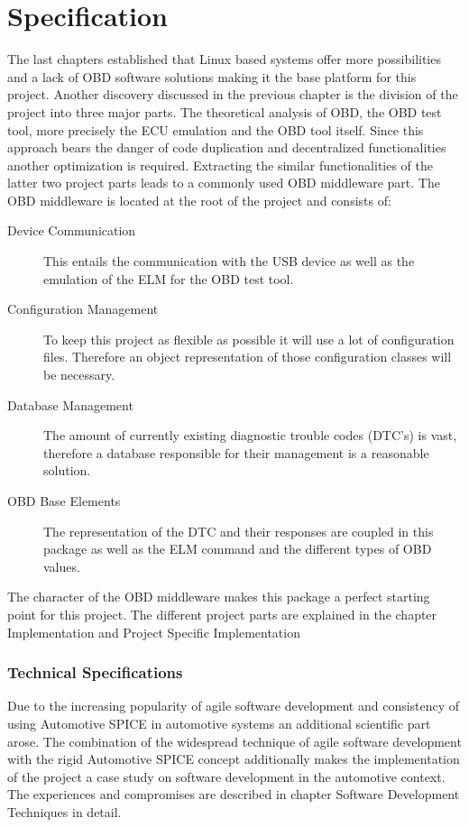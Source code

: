 
\chapter{Specification}
The last chapters established that Linux based systems offer more possibilities and a lack of OBD software solutions making it the base platform for 
this project. Another discovery discussed in the previous chapter is the division of the project into three major parts. The theoretical analysis of 
OBD, the OBD test tool, more precisely the ECU emulation and the OBD tool itself. Since this approach bears the danger of code duplication and 
decentralized functionalities another optimization is required.  Extracting the similar functionalities of the latter two project parts leads to a 
commonly used OBD middleware part. 
The OBD middleware is located at the root of the project and consists of:
\begin{description}
\item[Device Communication]

This entails the communication with the USB device as well as the emulation of the ELM for the OBD test tool.
\item[Configuration Management]

To keep this project as flexible as possible it will use a lot of configuration files. Therefore an object representation of those configuration 
classes will be necessary.
\item[Database Management]

The amount of currently existing diagnostic trouble codes (DTC’s) is vast, therefore a database responsible for their management is a reasonable 
solution.
\item[OBD Base Elements]

The representation of the DTC and their responses are coupled in this package as well as the ELM command and the different types of OBD values.
\end{description}

The character of the OBD middleware makes this package a perfect starting point for this project. 
The different project parts are explained in the chapter Implementation and Project Specific Implementation

\subsection{Technical Specifications}
Due to the increasing popularity of agile software development and consistency of using Automotive SPICE in automotive systems 
an additional scientific part arose. The combination of  the  widespread technique of agile software development with the  rigid Automotive 
SPICE concept additionally makes the implementation of the project a case study on software development in the automotive context. 
The experiences and compromises are described in chapter Software Development Techniques  in detail. 

